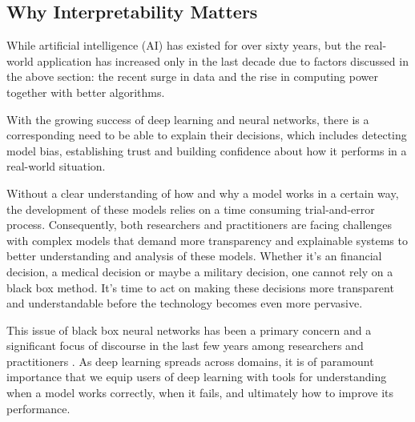 \subsection{Why Interpretability Matters}

While artificial intelligence (AI) has existed for over sixty years, but the real-world application has increased only in the last decade due to factors discussed in the above section: the recent surge in data and the rise in computing power together with better algorithms.

With the growing success of deep learning and neural networks, there is a corresponding need to be able to explain their decisions, which includes detecting model bias, establishing trust and building confidence about how it performs in a real-world situation.

Without a clear understanding of how and why a model works in a certain way, the development of these models relies on a time consuming trial-and-error process. Consequently, both researchers and practitioners are facing challenges with complex models that demand more transparency and explainable systems to better understanding and analysis of these models. Whether it's an financial decision, a medical decision or maybe a military decision, one cannot rely on a black box method. It's time to act on making these decisions more transparent and understandable before the technology becomes even more pervasive.

This issue of black box neural networks has been a primary concern and a significant focus of discourse in the last few years among researchers and practitioners \cite{Samek}. As deep learning spreads across domains, it is of paramount importance that we equip users of deep learning with tools for understanding when a model works correctly, when it fails, and ultimately how to improve its performance.

